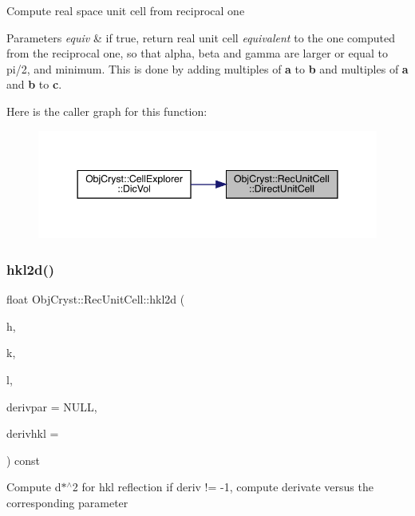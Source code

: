 Compute real space unit cell from reciprocal one


\begin{DoxyParams}{Parameters}
{\em equiv} & if true, return real unit cell {\itshape equivalent} to the one computed from the reciprocal one, so that alpha, beta and gamma are larger or equal to pi/2, and minimum. This is done by adding multiples of {\bfseries{a}} to {\bfseries{b}} and multiples of {\bfseries{a}} and {\bfseries{b}} to {\bfseries{c}}. \\
\hline
\end{DoxyParams}
Here is the caller graph for this function\+:
\nopagebreak
\begin{figure}[H]
\begin{center}
\leavevmode
\includegraphics[width=344pt]{class_obj_cryst_1_1_rec_unit_cell_ad8ad14d3c38e1926ea7e14a995824535_icgraph}
\end{center}
\end{figure}
\mbox{\label{class_obj_cryst_1_1_rec_unit_cell_a677f7a039a1018695f242a0e3868945b}} 
\subsubsection{\texorpdfstring{hkl2d()}{hkl2d()}}
{\footnotesize\ttfamily float Obj\+Cryst\+::\+Rec\+Unit\+Cell\+::hkl2d (\begin{DoxyParamCaption}\item[{const float}]{h,  }\item[{const float}]{k,  }\item[{const float}]{l,  }\item[{R\+E\+AL $\ast$}]{derivpar = {\ttfamily NULL},  }\item[{const unsigned int}]{derivhkl = {} }\end{DoxyParamCaption}) const}

Compute d$\ast$$^\wedge$2 for hkl reflection if deriv != -\/1, compute derivate versus the corresponding parameter

